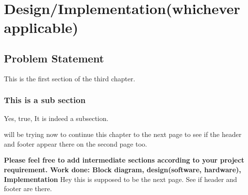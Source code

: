 \chapter{Design/Implementation(whichever applicable)} \label{Design/Implementation(whichever applicable)}
\section{Problem Statement} \label{Problem Statement}
This is the first section of the third chapter.

\subsection{This is a sub section} \label{This is a sub section}

Yes, true, It is indeed a subsection.

will be trying now to continue this chapter to the next page to see if the header and footer appear there on the second page too.

{\bfseries Please feel free to add intermediate sections according to your project requirement. Work done: Block diagram, design(software, hardware), Implementation}
\newpage
Hey this is supposed to be the next page. See if header and footer are there.